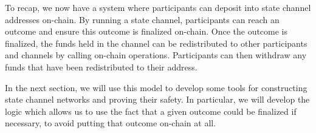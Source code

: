 To recap, we now have a system where participants can deposit into state channel addresses on-chain.
By running a state channel, participants can reach an outcome and ensure this outcome is finalized on-chain.
Once the outcome is finalized, the funds held in the channel can be redistributed to other participants and channels by calling on-chain operations.
Participants can then withdraw any funds that have been redistributed to their address.

In the next section, we will use this model to develop some tools for constructing state channel networks and proving their safety.
In particular, we will develop the logic which allows us to use the fact that a given outcome could be finalized if necessary, to avoid putting that outcome on-chain at all.
